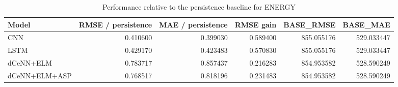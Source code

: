 \begin{table}
\caption{Performance relative to the persistence baseline for ENERGY}
\begin{tabular}{lrrrrr}
\toprule
Model & RMSE / persistence & MAE / persistence & RMSE gain & BASE\_RMSE & BASE\_MAE \\
\midrule
CNN & 0.410600 & 0.399030 & 0.589400 & 855.055176 & 529.033447 \\
LSTM & 0.429170 & 0.423483 & 0.570830 & 855.055176 & 529.033447 \\
dCeNN+ELM & 0.783717 & 0.857437 & 0.216283 & 854.953582 & 528.590249 \\
dCeNN+ELM+ASP & 0.768517 & 0.818196 & 0.231483 & 854.953582 & 528.590249 \\
\bottomrule
\end{tabular}
\end{table}
